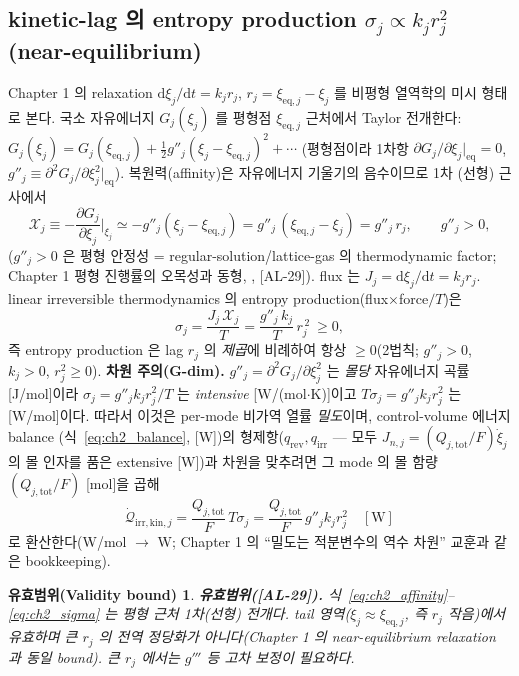 \documentclass[11pt,a4paper]{article}
\newtheorem*{boundbox}{유효범위(Validity bound)}
\newcommand{\dd}{\mathrm{d}}
\newcommand{\eq}{\mathrm{eq}}
\newcommand{\tot}{\mathrm{tot}}
\newcommand{\irr}{\mathrm{irr}}
\newcommand{\rev}{\mathrm{rev}}
\newcommand{\kin}{\mathrm{kin}}
\newcommand{\AL}[1]{\textsf{[AL-#1]}}
\begin{document}
\subsection{kinetic-lag 의 entropy production $\sigma_j\propto k_j r_j^2$ (near-equilibrium)}\label{sec:ch2_sigma}
Chapter 1 의 relaxation $\dd\xi_j/\dd t=k_j r_j$, $r_j=\xi_{\eq,j}-\xi_j$ 를 비평형 열역학의 미시 형태로 본다.
국소 자유에너지 $G_j(\xi_j)$ 를 평형점 $\xi_{\eq,j}$ 근처에서 Taylor 전개한다: $G_j(\xi_j)=G_j(\xi_{\eq,j})
+\tfrac12 g''_j(\xi_j-\xi_{\eq,j})^2+\cdots$ (평형점이라 1차항 $\partial G_j/\partial\xi_j|_{\eq}=0$,
$g''_j\equiv\partial^2 G_j/\partial\xi_j^2|_{\eq}$). 복원력(affinity)은 자유에너지 기울기의 음수이므로 1차
(선형) 근사에서
\begin{equation}
\mathcal X_j\equiv-\frac{\partial G_j}{\partial\xi_j}\Big|_{\xi_j}\simeq -g''_j(\xi_j-\xi_{\eq,j})=g''_j\,(\xi_{\eq,j}-\xi_j)=g''_j\,r_j,
\qquad g''_j>0,
\label{eq:ch2_affinity}
\end{equation}
($g''_j>0$ 은 평형 안정성 = regular-solution/lattice-gas 의 thermodynamic factor; Chapter 1 평형 진행률의
오목성과 동형, \cite{bazant2013}, \AL{29}). flux 는 $J_j=\dd\xi_j/\dd t=k_j r_j$. linear irreversible
thermodynamics 의 entropy production(flux$\times$force$/T$)은 \cite{degrootmazur1962,onsager1931}
\begin{equation}
\boxed{\;\sigma_j=\frac{J_j\,\mathcal X_j}{T}=\frac{g''_j\,k_j}{T}\,r_j^{\,2}\ \ge 0,\;}
\label{eq:ch2_sigma}
\end{equation}
즉 entropy production 은 lag $r_j$ 의 \emph{제곱}에 비례하여 항상 $\ge0$(2법칙; $g''_j>0$, $k_j>0$,
$r_j^2\ge0$). \textbf{차원 주의(G-dim).} $g''_j=\partial^2 G_j/\partial\xi_j^2$ 는 \emph{몰당} 자유에너지 곡률
[J/mol]이라 $\sigma_j=g''_j k_j r_j^2/T$ 는 \emph{intensive} [W/(mol$\cdot$K)]이고 $T\sigma_j=g''_j k_j r_j^2$
는 [W/mol]이다. 따라서 이것은 per-mode 비가역 열률 \emph{밀도}이며, control-volume 에너지 balance
(식~\eqref{eq:ch2_balance}, [W])의 형제항($q_\rev,q_\irr$ — 모두 $J_{n,j}=(Q_{j,\tot}/F)\dot\xi_j$ 의 몰 인자를
품은 extensive [W])과 차원을 맞추려면 그 mode 의 몰 함량 $(Q_{j,\tot}/F)$ [mol]을 곱해
\begin{equation}
\dot{\mathcal Q}_{\irr,\kin,j}=\frac{Q_{j,\tot}}{F}\,T\sigma_j=\frac{Q_{j,\tot}}{F}\,g''_j k_j r_j^2\quad[\mathrm W]
\label{eq:ch2_qirrkin_ext}
\end{equation}
로 환산한다(W/mol $\to$ W; Chapter 1 의 ``밀도는 적분변수의 역수 차원'' 교훈과 같은 bookkeeping).
\begin{boundbox}
\textbf{유효범위(\AL{29}).} 식~\eqref{eq:ch2_affinity}--\eqref{eq:ch2_sigma} 는 평형 근처 1차(선형) 전개다.
tail 영역($\xi_j\approx\xi_{\eq,j}$, 즉 $r_j$ 작음)에서 유효하며 큰 $r_j$ 의 전역 정당화가 아니다(Chapter 1
의 near-equilibrium relaxation 과 동일 bound). 큰 $r_j$ 에서는 $g'''$ 등 고차 보정이 필요하다.
\end{boundbox}
\end{document}
